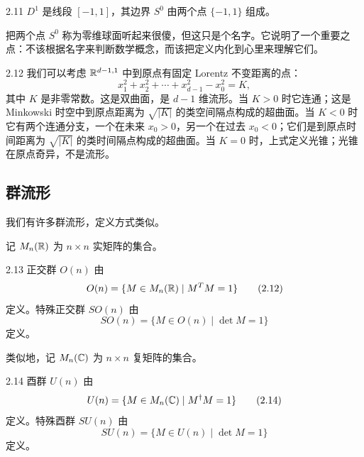 \begin{example}{2.11}
$D^1$ 是线段 $[-1,1]$，其边界 $S^0$ 由两个点 $\{-1,1\}$ 组成。
\end{example}

把两个点 $S^0$ 称为零维球面听起来很傻，但这只是个名字。它说明了一个重要之点：不该根据名字来判断数学概念，而该把定义内化到心里来理解它们。


\begin{example}{2.12}
我们可以考虑 $\mathbb{R}^{d-1,1}$ 中到原点有固定 Lorentz 不变距离的点：
\begin{equation}
x_1^2+x_2^2+\cdots+x_{d-1}^2-x_0^2=K, \tag{2.11}
\end{equation}
其中 $K$ 是非零常数。这是双曲面，是 $d-1$ 维流形。当 $K>0$ 时它连通；这是 Minkowski 时空中到原点距离为 $\sqrt{|K|}$ 的类空间隔点构成的超曲面。当 $K<0$ 时它有两个连通分支，一个在未来 $x_0>0$，另一个在过去 $x_0<0$；它们是到原点时间距离为 $\sqrt{|K|}$ 的类时间隔点构成的超曲面。当 $K=0$ 时，上式定义光锥；光锥在原点奇异，不是流形。
\end{example}

\subsection{群流形}

我们有许多群流形，定义方式类似。

记 $M_n(\mathbb{R})$ 为 $n\times n$ 实矩阵的集合。

\begin{example}{2.13}
正交群 $O(n)$ 由
\begin{equation}
O(n)=\{M\in M_n(\mathbb{R})\mid M^TM=1\} \tag{2.12}
\end{equation}
定义。特殊正交群 $SO(n)$ 由
\begin{equation}
SO(n)=\{M\in O(n)\mid \det M=1\} \tag{2.13}
\end{equation}
定义。
\end{example}

类似地，记 $M_n(\mathbb{C})$ 为 $n\times n$ 复矩阵的集合。

\begin{example}{2.14}
酉群 $U(n)$ 由
\begin{equation}
U(n)=\{M\in M_n(\mathbb{C})\mid M^\dagger M=1\} \tag{2.14}
\end{equation}
定义。特殊酉群 $SU(n)$ 由
\begin{equation}
SU(n)=\{M\in U(n)\mid \det M=1\} \tag{2.15}
\end{equation}
定义。
\end{example}

